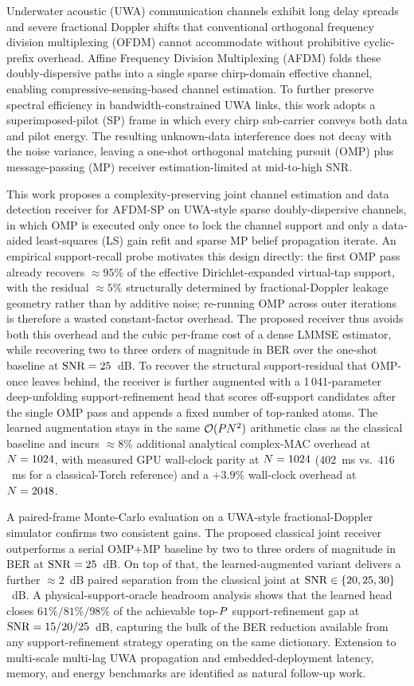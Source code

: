Underwater acoustic (UWA) communication channels exhibit long delay spreads and 
severe fractional Doppler shifts that conventional orthogonal frequency division 
multiplexing (OFDM) cannot accommodate without prohibitive cyclic-prefix overhead. 
Affine Frequency Division Multiplexing (AFDM) folds these doubly-dispersive paths 
into a single sparse chirp-domain effective channel, enabling 
compressive-sensing-based channel estimation. To further preserve spectral 
efficiency in bandwidth-constrained UWA links, this work adopts a 
superimposed-pilot (SP) frame in which every chirp sub-carrier conveys both data 
and pilot energy. The resulting unknown-data interference does not decay with the 
noise variance, leaving a one-shot orthogonal matching pursuit (OMP) plus 
message-passing (MP) receiver estimation-limited at mid-to-high SNR.

This work proposes a complexity-preserving joint channel estimation and data detection
receiver for AFDM-SP on UWA-style sparse doubly-dispersive channels, in which OMP
is executed only once to lock the channel support and only a data-aided 
least-squares (LS) gain refit and sparse MP belief propagation iterate. An 
empirical support-recall probe motivates this design directly: the first OMP pass 
already recovers $\approx 95\%$ of the effective Dirichlet-expanded virtual-tap 
support, with the residual $\approx 5\%$ structurally determined by 
fractional-Doppler leakage geometry rather than by additive noise; re-running OMP 
across outer iterations is therefore a wasted constant-factor overhead. The 
proposed receiver thus avoids both this overhead and the cubic per-frame cost of a 
dense LMMSE estimator, while recovering two to three orders of magnitude in BER 
over the one-shot baseline at $\mathrm{SNR} = 25$~dB. To recover the structural 
support-residual that OMP-once leaves behind, the receiver is further augmented 
with a 1\,041-parameter deep-unfolding support-refinement head that scores 
off-support candidates after the single OMP pass and appends a fixed number of 
top-ranked atoms. The learned augmentation stays in the same
$\mathcal{O}(P N^2)$ arithmetic class as the classical baseline and
incurs $\approx 8\%$ additional analytical complex-MAC overhead at
$N = 1024$, with measured GPU wall-clock parity at $N = 1024$
($402$~ms vs.\ $416$~ms for a classical-Torch reference) and a $+3.9\%$
wall-clock overhead at $N = 2048$.

A paired-frame Monte-Carlo evaluation on a UWA-style fractional-Doppler simulator 
confirms two consistent gains. The proposed classical joint receiver outperforms a 
serial OMP+MP baseline by two to three orders of magnitude in BER at $\mathrm{SNR} = 
25$~dB. On top of that, the learned-augmented variant delivers a further $\approx 
2$~dB paired separation from the classical joint at $\mathrm{SNR} \in \{20, 25, 30\}$~dB. 
A physical-support-oracle headroom analysis shows that the learned head closes 
$61\%/81\%/98\%$ of the achievable top-$P$ support-refinement gap at 
$\mathrm{SNR} = 15/20/25$~dB, capturing the bulk of the BER reduction available from any 
support-refinement strategy operating on the same dictionary. Extension to 
multi-scale multi-lag UWA propagation and embedded-deployment latency, memory, 
and energy benchmarks are identified as natural follow-up work.